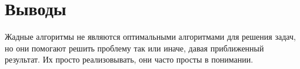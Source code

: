 \section{Выводы}

Жадные алгоритмы не являются оптимальными алгоритмами для решения задач, но они помогают решить проблему так или иначе, давая приближенный результат. Их просто реализовывать, они часто просты в понимании.
\pagebreak